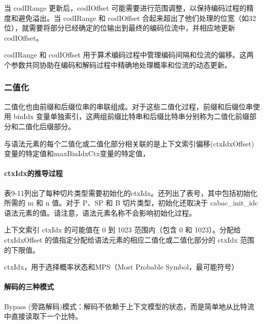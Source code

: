 \documentclass{/Users/hi/Study/template/code}
\begin{document}
当 codIRange 更新后，codIOffset 可能需要进行范围调整，以保持编码过程的精度和避免溢出。当 codIRange 和 codIOffset 合起来超出了他们处理的位宽（如32位），就需要将部分已经确定的位输出到最终的编码位流中，并相应地更新 codIOffset。

codIRange 和 codIOffset 用于算术编码过程中管理编码间隔和位流的偏移。这两个参数共同协助在编码和解码过程中精确地处理概率和位流的动态更新。

\subsubsection{二值化}

二值化也由前缀和后缀位串的串联组成。对于这些二值化过程，前缀和后缀位串使用 binIdx 变量单独索引，这两组前缀比特串和后缀比特串分别称为二值化前缀部分和二值化后缀部分。

与语法元素的每个二值化或二值化部分相关联的是上下文索引偏移(ctxIdxOffset)变量的特定值和maxBinIdxCtx变量的特定值，





\paragraph{ctxIdx的推导过程}
表9-11列出了每种切片类型需要初始化的ctxIdx。还列出了表号，其中包括初始化所需的 m 和 n 值。对于 P、SP 和 B 切片类型，初始化还取决于 cabac\_init\_idc 语法元素的值。请注意，语法元素名称不会影响初始化过程。

上下文索引 ctxIdx 的可能值在 0 到 1023 范围内（包含 0 和 1023）。分配给 ctxIdxOffset 的值指定分配给语法元素的相应二值化或二值化部分的 ctxIdx 范围的下限值。

ctxIdx，用于选择概率状态和MPS（Most Probable Symbol，最可能符号）


\paragraph{解码的三种模式}
Bypass (旁路解码)模式：解码不依赖于上下文模型的状态，而是简单地从比特流中直接读取下一个比特。
\end{document}
